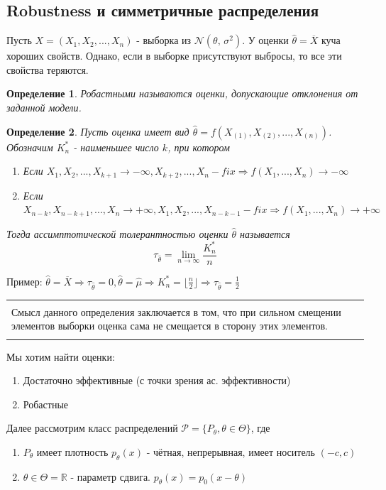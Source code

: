 \documentclass[a4paper,12pt]{article}
\newcommand{\orst}[2]{#1_{(#2)}}
\newcommand{\normal}[2]{\mathcal{N}(#1,\,#2)}
\newcommand{\sample}{X_1, X_2, ..., X_n}
\newcommand{\R}{\mathbb{R}}
\newenvironment{annotation}{\begin{center}
    \begin{tabular}{|p{0.9\textwidth}|}
    \hline\\
}
{ 
    \\\\\hline
    \end{tabular} 
    \end{center}
}
\newtheorem{dfn}{Определение}[section]
\theoremstyle{named}
\begin{document}
\subsection{Robustness и симметричные распределения}
Пусть $X = (\sample)$ - выборка из $\normal{\theta}{\sigma^2}$. У оценки $\hat\theta = \overline{X}$ куча хороших свойств. Однако, если в выборке
присутствуют выбросы, то все эти свойства теряются. 
\begin{dfn}
    Робастными называются оценки, допускающие отклонения от заданной модели. 
\end{dfn}
\begin{dfn}
    Пусть оценка имеет вид $\hat\theta = f(\orst{X}{1}, \orst{X}{2}, ..., \orst{X}{n})$. Обозначим $K_n^*$ - наименьшее число $k$, при котором 
    \begin{enumerate}
        \item Если $X_1, X_2, ..., X_{k+1} \to -\infty, X_{k+2}, ..., X_n - fix \Rightarrow f(X_1, ..., X_n) \to -\infty$
        \item Если $X_{n-k}, X_{n-k+1}, ..., X_n \to +\infty, X_1, X_2, ..., X_{n-k-1} - fix \Rightarrow f(X_1, ..., X_n) \to +\infty$
    \end{enumerate}
    Тогда ассимптотической толерантностью оценки $\hat\theta $ называется 
    $$
        \tau_{\hat\theta} = \lim_{n\to \infty} \frac{K_n^*}{n}
    $$
\end{dfn}
Пример: $\hat\theta = \overline{X} \Rightarrow \tau_{\hat\theta} = 0, \hat\theta = \hat\mu \Rightarrow K_n^* = \lfloor\frac{n}{2}\rfloor \Rightarrow
\tau_{\hat\theta} = \frac{1}{2}$
\begin{annotation}
    Смысл данного определения заключается в том, что при сильном смещении элементов выборки оценка сама не смещается в сторону этих элементов.
\end{annotation}
Мы хотим найти оценки:
\begin{enumerate}
    \item Достаточно эффективные (с точки зрения ас. эффективности)
    \item Робастные
\end{enumerate}
Далее рассмотрим класс распределений $\mathcal{P} = \{P_\theta, \theta \in \Theta \}$, где 
\begin{enumerate}
    \item $P_\theta$ имеет плотность $p_\theta(x)$ - чётная, непрерывная, имеет носитель $(-c, c)$
    \item $\theta \in \Theta = \R$ - параметр сдвига. $p_\theta(x) = p_0(x - \theta)$
\end{enumerate}
\end{document}
